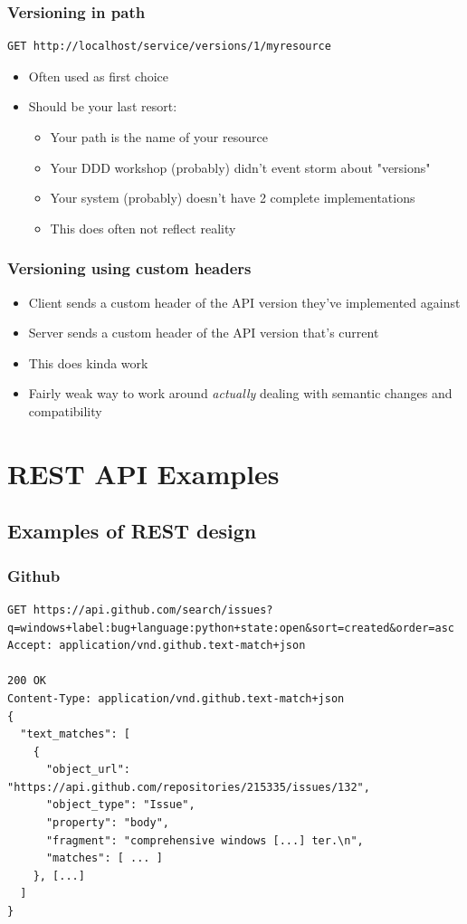 \documentclass[8pt]{article}
\begin{document}
\subsubsection{Versioning in path}
\label{sec:orgc08af65}
\begin{verbatim}
GET http://localhost/service/versions/1/myresource
\end{verbatim}
\begin{itemize}
\item Often used as first choice
\item Should be your last resort:
\begin{itemize}
\item Your path is the name of your resource
\item Your DDD workshop (probably) didn't event storm about "versions"
\item Your system (probably) doesn't have 2 complete implementations
\item This does often not reflect reality
\end{itemize}
\end{itemize}
\subsubsection{Versioning using custom headers}
\label{sec:org78a9adf}
\begin{itemize}
\item Client sends a custom header of the API version they've implemented against
\item Server sends a custom header of the API version that's current
\item This does kinda work

\item Fairly weak way to work around \emph{actually} dealing with semantic changes and compatibility
\end{itemize}
\section{REST API Examples}
\label{sec:orgf1f5c7e}
\subsection{Examples of REST design}
\label{sec:org9dda7a7}
\subsubsection{Github}
\label{sec:org048c306}
\begin{verbatim}
GET https://api.github.com/search/issues?q=windows+label:bug+language:python+state:open&sort=created&order=asc
Accept: application/vnd.github.text-match+json

200 OK
Content-Type: application/vnd.github.text-match+json
{
  "text_matches": [
    {
      "object_url": "https://api.github.com/repositories/215335/issues/132",
      "object_type": "Issue",
      "property": "body",
      "fragment": "comprehensive windows [...] ter.\n",
      "matches": [ ... ]
    }, [...]
  ]
}
\end{verbatim}
\end{document}
